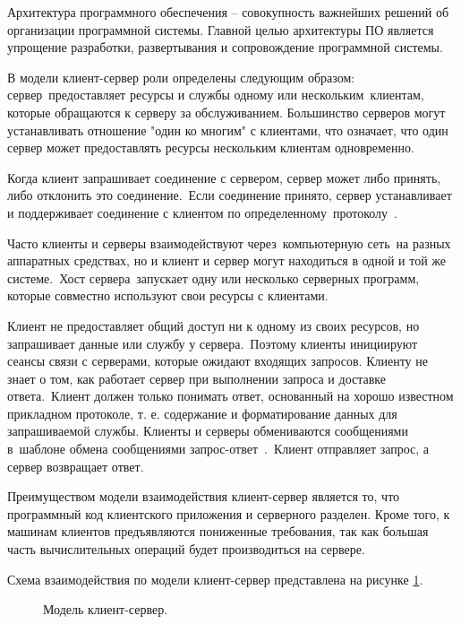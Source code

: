 \documentclass[a4paper,14pt]{article}
\begin{document}
Архитектура программного обеспечения – совокупность важнейших решений об организации программной системы. Главной целью архитектуры ПО является упрощение разработки, развертывания и сопровождение программной системы.

В модели клиент-сервер роли определены следующим образом: сервер предоставляет ресурсы и службы одному или нескольким клиентам, которые обращаются к серверу за обслуживанием. Большинство серверов могут устанавливать отношение "один ко многим" с клиентами, что означает, что один сервер может предоставлять ресурсы нескольким клиентам одновременно. 

Когда клиент запрашивает соединение с сервером, сервер может либо принять, либо отклонить это соединение. Если соединение принято, сервер устанавливает и поддерживает соединение с клиентом по определенному протоколу . 

Часто клиенты и серверы взаимодействуют через компьютерную сеть на разных аппаратных средствах, но и клиент и сервер могут находиться в одной и той же системе. Хост сервера запускает одну или несколько серверных программ, которые совместно используют свои ресурсы с клиентами. 

Клиент не предоставляет общий доступ ни к одному из своих ресурсов, но запрашивает данные или службу у сервера. Поэтому клиенты инициируют сеансы связи с серверами, которые ожидают входящих запросов. Клиенту не знает о том, как работает сервер при выполнении запроса и доставке ответа. Клиент должен только понимать ответ, основанный на хорошо известном прикладном протоколе, т. е. содержание и форматирование данных для запрашиваемой службы. Клиенты и серверы обмениваются сообщениями в шаблоне обмена сообщениями запрос-ответ . Клиент отправляет запрос, а сервер возвращает ответ. 

Преимуществом модели взаимодействия клиент-сервер является то, что программный код клиентского приложения и серверного разделен. Кроме того, к машинам клиентов предъявляются пониженные требования, так как большая часть вычислительных операций будет производиться на сервере.

Схема взаимодействия по модели клиент-сервер представлена на рисунке \ref{fig:cli_ser}.

\begin{figure}[!h]
	\caption{Модель клиент-сервер.}
	\label{fig:cli_ser}
\end{figure}
\end{document}
